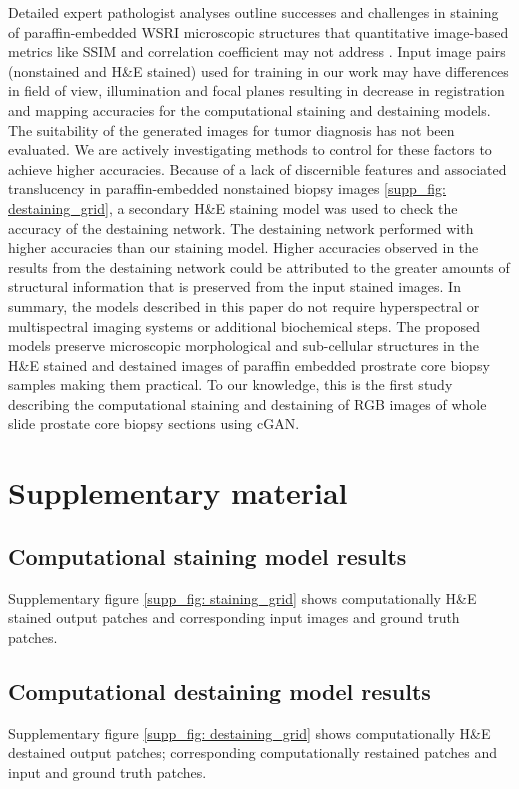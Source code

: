 \documentclass[10pt, conference, compsocconf]{IEEEtran}
\begin{document}
Detailed expert pathologist analyses outline successes and challenges in staining of paraffin-embedded WSRI microscopic structures that quantitative image-based metrics like SSIM and correlation coefficient may not address \cite{pambrun2015limitations}. Input image pairs (nonstained and H\&E stained) used for training in our work may have differences in field of view, illumination and focal planes resulting in decrease in registration and mapping accuracies for the computational staining and destaining models. The suitability of the generated images for tumor diagnosis has not been evaluated. We are actively investigating methods to control for these factors to achieve higher accuracies. Because of a lack of discernible features and associated translucency in paraffin-embedded nonstained biopsy images \ref{supp_fig: destaining_grid}, a secondary H\&E staining model was used to check the accuracy of the destaining network. The destaining network performed with higher accuracies than our staining model. Higher accuracies observed in the results from the destaining network could be attributed to the greater amounts of structural information that is preserved from the input stained images. In summary, the models described in this paper do not require hyperspectral or multispectral imaging systems or additional biochemical steps. The proposed models preserve microscopic morphological and sub-cellular structures in the H\&E stained and destained images of paraffin embedded prostrate core biopsy samples making them practical. To our knowledge, this is the first study describing the computational staining and destaining of RGB images of whole slide prostate core biopsy sections using cGAN.


\renewcommand{\thefigure}{A.\arabic{figure}}
\setcounter{figure}{0}

\section{Supplementary material}

\subsection{Computational staining model results}
Supplementary figure \ref{supp_fig: staining_grid} shows computationally H\&E stained output patches and corresponding input images and ground truth patches.

\subsection{Computational destaining model results}
Supplementary figure \ref{supp_fig: destaining_grid} shows computationally H\&E destained output patches; corresponding computationally restained patches and input and ground truth patches.
\end{document}
